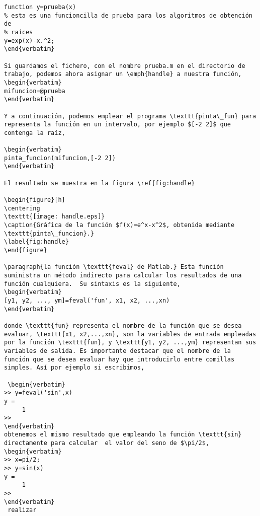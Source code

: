 \begin{lstlisting}
function y=prueba(x)
% esta es una funcioncilla de prueba para los algoritmos de obtención de
% raíces
y=exp(x)-x.^2;
\end{verbatim}

Si guardamos el fichero, con el nombre prueba.m en el directorio de trabajo, podemos ahora asignar un \emph{handle} a nuestra función,
\begin{verbatim}
mifuncion=@prueba 
\end{verbatim}

Y a continuación, podemos emplear el programa \texttt{pinta\_fun} para representa la función en un intervalo, por ejemplo $[-2 2]$ que contenga la raíz,

\begin{verbatim}
pinta_funcion(mifuncion,[-2 2])
\end{verbatim} 

El resultado se muestra en la figura \ref{fig:handle}

\begin{figure}[h]
\centering
\texttt{[image: handle.eps]}
\caption{Gráfica de la función $f(x)=e^x-x^2$, obtenida mediante \texttt{pinta\_funcion}.}
\label{fig:handle}
\end{figure}

\paragraph{la función \texttt{feval} de Matlab.} Esta función suministra un método indirecto para calcular los resultados de una función cualquiera.  Su sintaxis es la siguiente,
\begin{verbatim} 
[y1, y2, ..., ym]=feval('fun', x1, x2, ...,xn)
\end{verbatim}

donde \texttt{fun} representa el nombre de la función que se desea evaluar, \texttt{x1, x2,...,xn}, son la variables de entrada empleadas por la función \texttt{fun}, y \texttt{y1, y2, ...,ym} representan sus variables de salida. Es importante destacar que el nombre de la función que se desea evaluar hay que introducirlo entre comillas simples. Así por ejemplo si escribimos,

 \begin{verbatim}
>> y=feval('sin',x)
y =
     1
>> 
\end{verbatim}
obtenemos el mismo resultado que empleando la función \texttt{sin} directamente para calcular  el valor del seno de $\pi/2$,
\begin{verbatim}
>> x=pi/2;
>> y=sin(x)
y =
     1
>> 
\end{verbatim}
 realizar 




\end{lstlisting}
